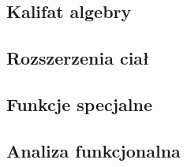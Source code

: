 \begin{multicols*}{2} \raggedcolumns \chapter{Kalifat algebry}
	
	
	
	
	
	
	
	
\end{multicols*}

\begin{multicols*}{2} \raggedcolumns \chapter{Rozszerzenia ciał}
	
	
	
	
	
	
	
	
	
\end{multicols*}

\begin{multicols*}{2} \raggedcolumns \chapter{Funkcje specjalne\label{parum}}
	
	
	
	
	
	
	 
	 

	
	 
	 
	
	
	
	
	
	
	
	
\end{multicols*}

\begin{multicols*}{2} \raggedcolumns \chapter{Analiza funkcjonalna}
	
\end{multicols*}

